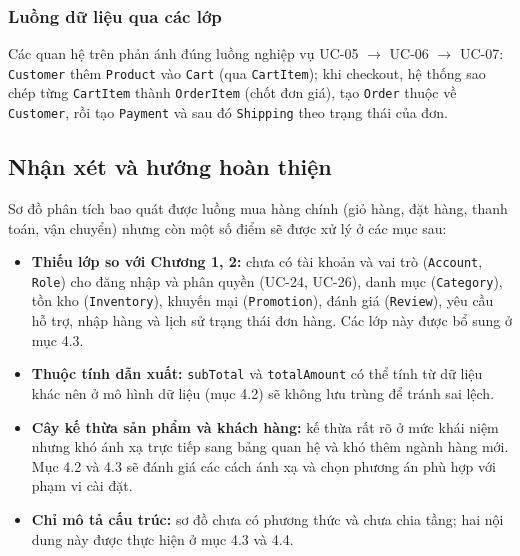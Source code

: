 \documentclass[12pt,a4paper,oneside]{report}
\begin{document}
\subsubsection*{Luồng dữ liệu qua các lớp}

Các quan hệ trên phản ánh đúng luồng nghiệp vụ UC-05 $\rightarrow$ UC-06 $\rightarrow$ UC-07: \texttt{Customer} thêm \texttt{Product} vào \texttt{Cart} (qua \texttt{CartItem}); khi checkout, hệ thống sao chép từng \texttt{CartItem} thành \texttt{OrderItem} (chốt đơn giá), tạo \texttt{Order} thuộc về \texttt{Customer}, rồi tạo \texttt{Payment} và sau đó \texttt{Shipping} theo trạng thái của đơn.

\subsection{Nhận xét và hướng hoàn thiện}

Sơ đồ phân tích bao quát được luồng mua hàng chính (giỏ hàng, đặt hàng, thanh toán, vận chuyển) nhưng còn một số điểm sẽ được xử lý ở các mục sau:

\begin{itemize}
  \item \textbf{Thiếu lớp so với Chương 1, 2:} chưa có tài khoản và vai trò (\texttt{Account}, \texttt{Role}) cho đăng nhập và phân quyền (UC-24, UC-26), danh mục (\texttt{Category}), tồn kho (\texttt{Inventory}), khuyến mại (\texttt{Promotion}), đánh giá (\texttt{Review}), yêu cầu hỗ trợ, nhập hàng và lịch sử trạng thái đơn hàng. Các lớp này được bổ sung ở mục 4.3.
  \item \textbf{Thuộc tính dẫn xuất:} \texttt{subTotal} và \texttt{totalAmount} có thể tính từ dữ liệu khác nên ở mô hình dữ liệu (mục 4.2) sẽ không lưu trùng để tránh sai lệch.
  \item \textbf{Cây kế thừa sản phẩm và khách hàng:} kế thừa rất rõ ở mức khái niệm nhưng khó ánh xạ trực tiếp sang bảng quan hệ và khó thêm ngành hàng mới. Mục 4.2 và 4.3 sẽ đánh giá các cách ánh xạ và chọn phương án phù hợp với phạm vi cài đặt.
  \item \textbf{Chỉ mô tả cấu trúc:} sơ đồ chưa có phương thức và chưa chia tầng; hai nội dung này được thực hiện ở mục 4.3 và 4.4.
\end{itemize}


\end{document}
